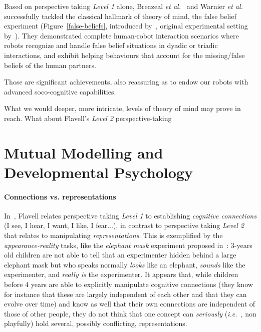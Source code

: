 \documentclass{sig-alternate}
\newcommand{\etal}{{\textit{et al.~}}}
\newcommand{\ie}{{\textit{i.e.~}}}
\begin{document}
Based on perspective taking \emph{Level 1} alone, Breazeal
\etal\cite{breazeal2009embodied} and Warnier \etal\cite{warnier2012when}
successfully tackled the classical hallmark of theory of mind, the false belief
experiment (Figure~\ref{false-beliefs}, introduced by~\cite{wimmer1983beliefs},
original experimental setting by~\cite{baron1985does}). They demonstrated
complete human-robot interaction scenarios where robots recognize and handle
false belief situations in dyadic or triadic interactions, and exhibit helping
behaviours that account for the missing/false beliefs of the human partners.

Those are significant achievements, also reassuring as to endow our robots with
advanced soco-cognitive capabilities.

What we would
deeper, more
intricate, levels of theory of mind may prove in reach. What about Flavell's
\emph{Level 2} perspective-taking


\section{Mutual Modelling and Developmental Psychology}

\paragraph{Connections vs. representations}

In~\cite{flavell1990developmental}, Flavell relates perspective taking
\emph{Level 1} to establishing \emph{cognitive connections} (I see, I hear, I
want, I like, I fear...), in contrast to perspective taking \emph{Level 2} that
relates to manipulating \emph{representations}.  This is exemplified by the
\emph{appearance-reality} tasks, like the \emph{elephant mask} experiment
proposed in~\cite{flavell1990developmental}: 3-years old children are not able
to tell that an experimenter hidden behind a large elephant mask but who speaks
normally \emph{looks} like an elephant, \emph{sounds} like the experimenter, and
\emph{really is} the experimenter.  It appears that, while children before 4
years are able to explicitly manipulate cognitive connections (they know for
instance that these are largely independent of each other and that they can
evolve over time) and know as well that their own connections are independent of
those of other people, they do not think that one concept can \emph{seriously}
(\ie, non playfully) hold several, possibly conflicting, representations.
\end{document}
